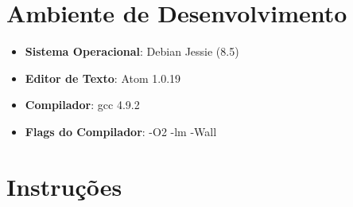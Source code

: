 \section{Ambiente de Desenvolvimento}
	\begin{itemize}
		\item{\textbf{Sistema Operacional}: Debian Jessie (8.5)}
		\item{\textbf{Editor de Texto}: Atom 1.0.19}
		\item{\textbf{Compilador}: gcc 4.9.2}
		\item{\textbf{Flags do Compilador}: -O2 -lm -Wall}
	\end{itemize}

\section{Instruções}
